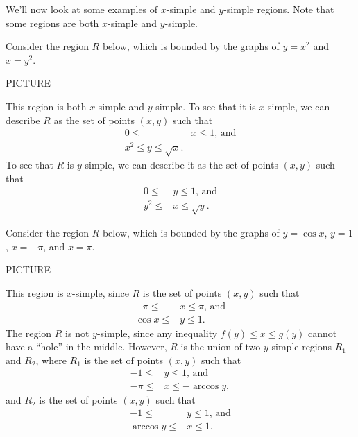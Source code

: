 \documentclass{ximera}
\begin{document}
We'll now look at some examples of $x$-simple and $y$-simple regions. Note that some regions are both $x$-simple and $y$-simple.

\begin{example}
Consider the region $R$ below, which is bounded by the graphs of $y=x^2$ and $x=y^2$.

PICTURE

This region is both $x$-simple and $y$-simple. To see that it is $x$-simple, we can describe $R$ as the set of points $(x,y)$ such that 
\begin{align*}
0\leq &x\leq 1\text{, and}\\
x^2\leq y\leq \sqrt{x}.
\end{align*}
To see that $R$ is $y$-simple, we can describe it as the set of points $(x,y)$ such that
\begin{align*}
0\leq &y\leq 1\text{, and}\\
y^2\leq &x\leq \sqrt{y}.
\end{align*}
\end{example}

\begin{example}
Consider the region $R$ below, which is bounded by the graphs of $y=\cos x$, $y=1$, $x=-\pi$, and $x=\pi$.

PICTURE

This region is $x$-simple, since $R$ is the set of points $(x,y)$ such that
\begin{align*}
-\pi\leq &x\leq \pi\text{, and}\\
\cos x\leq &y\leq 1.
\end{align*}
The region $R$ is not $y$-simple, since any inequality $f(y)\leq x\leq g(y)$ cannot have a ``hole'' in the middle. However, $R$ is the union of two $y$-simple regions $R_1$ and $R_2$, where $R_1$ is the set of points $(x,y)$ such that
\begin{align*}
-1\leq &y\leq 1\text{, and}\\
-\pi\leq &x\leq -\arccos y,
\end{align*} 
and $R_2$ is the set of points $(x,y)$ such that
\begin{align*}
-1\leq &y\leq 1\text{, and}\\
\arccos y\leq &x\leq 1.
\end{align*} 
\end{example}
\end{document}
